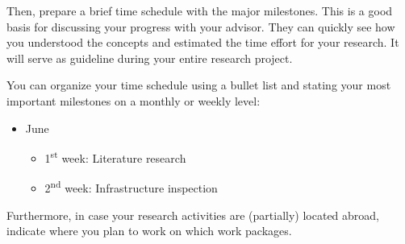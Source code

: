 \documentclass[a4paper]{article}
\begin{document}
Then, prepare a brief time schedule with the major milestones.
This is a good basis for discussing your progress with your advisor.
They can quickly see how you understood the concepts and estimated the time effort for your research.
It will serve as guideline during your entire research project.

You can organize your time schedule using a bullet list and stating your most important milestones on a monthly or weekly level:
\begin{itemize}
\item June
	\begin{itemize}
	\item 1\textsuperscript{st} week: Literature research
	\item 2\textsuperscript{nd} week: Infrastructure inspection
	\end{itemize}
\end{itemize}

\noindent Furthermore, in case your research activities are (partially) located abroad, indicate where you plan to work on which work packages.
\end{document}
